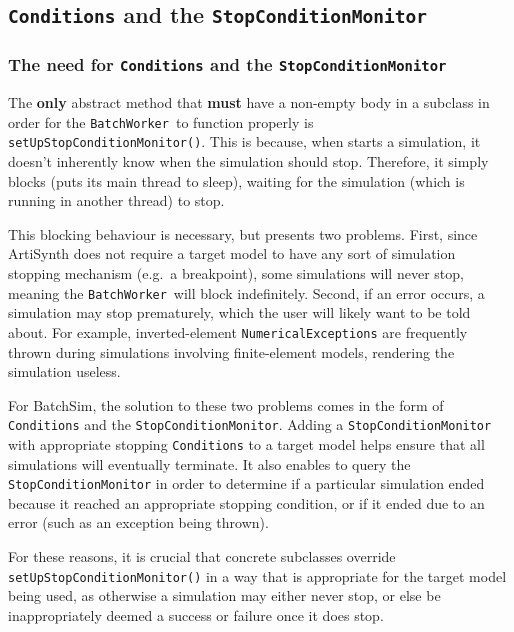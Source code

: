 \documentclass{article}
\newcommand{\BW}{{\tt BatchWorker}}
\begin{document}
\subsection{{\tt Conditions} and the {\tt StopConditionMonitor}}
\label{custom:stop-conditions}

\subsubsection{The need for {\tt Conditions} and the {\tt StopConditionMonitor}}

The \textbf{only}  abstract method that \textbf{must} have a non-empty body in a subclass in order for the \BW\ to function properly is {\tt setUpStopConditionMonitor()}. This is because, when  starts a simulation, it doesn't inherently know when the simulation should stop. Therefore, it simply blocks (puts its main thread to sleep), waiting for the simulation (which is running in another thread) to stop.

This blocking behaviour is necessary, but presents two problems. First, since ArtiSynth does not require a target model to have any sort of simulation stopping mechanism (e.g.\ a breakpoint), some simulations will never stop, meaning the \BW\ will block indefinitely. Second, if an error occurs, a simulation may stop prematurely, which the user will likely want to be told about. For example, inverted-element {\tt NumericalExceptions} are frequently thrown during simulations involving finite-element models, rendering the simulation useless.

For BatchSim, the solution to these two problems comes in the form of {\tt Conditions} and the {\tt StopConditionMonitor}. Adding a {\tt StopConditionMonitor} with appropriate stopping {\tt Conditions} to a target model helps ensure that all simulations will eventually terminate. It also enables  to query the {\tt StopConditionMonitor} in order to determine if a particular simulation ended because it reached an appropriate stopping condition, or if it ended due to an error (such as an exception being thrown).

For these reasons, it is crucial that concrete  subclasses override {\tt setUpStopConditionMonitor()} in a way that is appropriate for the target model being used, as otherwise a simulation may either never stop, or else be inappropriately deemed a success or failure once it does stop.
\end{document}
